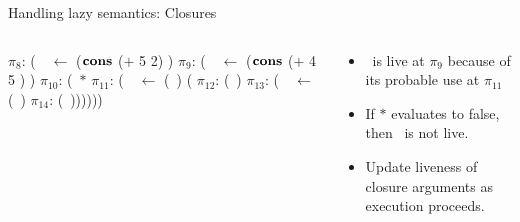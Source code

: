 \documentclass[xcolor=x11names,compress,mathserif]{beamer}
\renewcommand{\(}{\begin{columns}}
\renewcommand{\)}{\end{columns}}
\newcommand{\<}[1]{\begin{column}{#1}}
\renewcommand{\>}{\end{column}}
\begin{document}
\begin{frame}{Handling lazy semantics: Closures}
\begin{columns}[c]
    \begin{column}[T]{0.5\textwidth}
      \hspace*{-.3cm}\renewcommand{\arraystretch}{1}{
        \begin{uprogram}
          \hspace*{-.4cm} $\pi_8\!\!:\, $(\LET\  \px\  $\leftarrow$ ($\mbox{$\mathbf{cons}$}$ ($+$ 5 2) \NIL)  \IN
             \hspace*{-.3cm}   $\pi_9\!\!:\, $(\LET\ \pz\ $\leftarrow$ ($\mbox{$\mathbf{cons}$}$ ($+$ 4 5 ) \px) \IN
             \hspace*{-.3cm}   $\pi_{10}\!\!:\, $(\SIF\ $*$
             \hspace*{-.35cm} $\pi_{11}\!\!:\, $(\LET\ \pw\  $\leftarrow$ (\plength\ \pz) (\IN
             \hspace*{-.38cm}  $\pi_{12}\!\!:\, $(\RETURN\ \pw)
             \hspace*{-.35cm}  $\pi_{13}\!\!:\, $(\LET\ \pb\  $\leftarrow$ (\pfun\  \pz) \IN
             \hspace*{-.38cm} $\pi_{14}\!\!:\,$(\RETURN\ \pb))))))
   \end{uprogram}}
    \end{column}
    \begin{column}[T]{0.5\textwidth}
      \begin{itemize}
      \item \px\ is live at $\pi_{9}$  because of its probable use at $\pi_{11}$
      \item If $*$ evaluates to false, then \px\ is not live.
      \item Update liveness of closure arguments as execution proceeds.
      \end{itemize}
    \end{column}
  \end{columns}  
\end{frame}
\end{document}
